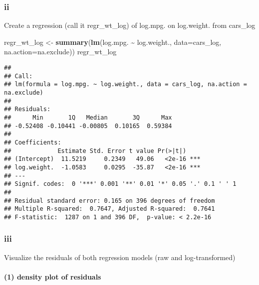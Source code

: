 \documentclass[
]{article}
\newenvironment{Shaded}{\begin{snugshade}}{\end{snugshade}}
\newcommand{\AttributeTok}[1]{\textcolor[rgb]{0.13,0.29,0.53}{#1}}
\newcommand{\FunctionTok}[1]{\textcolor[rgb]{0.13,0.29,0.53}{\textbf{#1}}}
\newcommand{\NormalTok}[1]{#1}
\newcommand{\OtherTok}[1]{\textcolor[rgb]{0.56,0.35,0.01}{#1}}
\newcommand{\SpecialCharTok}[1]{\textcolor[rgb]{0.81,0.36,0.00}{\textbf{#1}}}
\begin{document}
\hypertarget{ii-1}{%
\subsubsection{ii}\label{ii-1}}

Create a regression (call it regr\_wt\_log) of log.mpg. on log.weight.
from cars\_log

\begin{Shaded}
\begin{Highlighting}[]
\NormalTok{regr\_wt\_log }\OtherTok{\textless{}{-}} \FunctionTok{summary}\NormalTok{(}\FunctionTok{lm}\NormalTok{(log.mpg. }\SpecialCharTok{\textasciitilde{}}\NormalTok{ log.weight., }\AttributeTok{data=}\NormalTok{cars\_log, }\AttributeTok{na.action=}\NormalTok{na.exclude))}
\NormalTok{regr\_wt\_log}
\end{Highlighting}
\end{Shaded}

\begin{verbatim}
## 
## Call:
## lm(formula = log.mpg. ~ log.weight., data = cars_log, na.action = na.exclude)
## 
## Residuals:
##      Min       1Q   Median       3Q      Max 
## -0.52408 -0.10441 -0.00805  0.10165  0.59384 
## 
## Coefficients:
##             Estimate Std. Error t value Pr(>|t|)    
## (Intercept)  11.5219     0.2349   49.06   <2e-16 ***
## log.weight.  -1.0583     0.0295  -35.87   <2e-16 ***
## ---
## Signif. codes:  0 '***' 0.001 '**' 0.01 '*' 0.05 '.' 0.1 ' ' 1
## 
## Residual standard error: 0.165 on 396 degrees of freedom
## Multiple R-squared:  0.7647, Adjusted R-squared:  0.7641 
## F-statistic:  1287 on 1 and 396 DF,  p-value: < 2.2e-16
\end{verbatim}

\hypertarget{iii-1}{%
\subsubsection{iii}\label{iii-1}}

Visualize the residuals of both regression models (raw and
log-transformed)

\hypertarget{density-plot-of-residuals}{%
\paragraph{(1) density plot of
residuals}\label{density-plot-of-residuals}}
\end{document}
